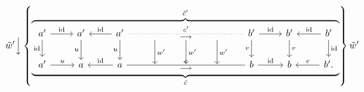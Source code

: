 \documentclass[11pt]{article}
\newcommand{\printedpage}[1]{\marginpar{\footnotesize p.~#1}}
\begin{document}
\printedpage{105}
\[
\tilde{w}'\Big\downarrow
\left\{
\overbrace{\underbrace{
\begin{tikzcd}[ampersand replacement=\&]
a' \arrow[r, "\mathrm{id}"] \arrow[d, "\mathrm{id}"'] \& a' \arrow[d, "u"'] \& a' \arrow[l, "\mathrm{id}"'] \arrow[d, "u"'] \arrow[rrrr, dotted, no head, "c'", "\longrightarrow"'] \& {} \arrow[d, "w'"] \& {} \arrow[d, "w'"] \& {} \arrow[d, "w'"] \& b' \arrow[r, "\mathrm{id}"] \arrow[d, "v"'] \& b' \arrow[d, "v"] \& b' \arrow[l, "\mathrm{id}"'] \arrow[d, "\mathrm{id}"] \\
a' \arrow[r, "u"] \& a \& a \arrow[l, "\mathrm{id}"'] \arrow[rrrr, no head, "c", "\longrightarrow"'] \& {} \& {} \& {} \& b \arrow[r, "\mathrm{id}"] \& b \& b'. \arrow[l, "v"']
\end{tikzcd}
}_{\tilde{c}}}^{\tilde{c}'}
\right\}
\tilde{w}'
\]
\end{document}
